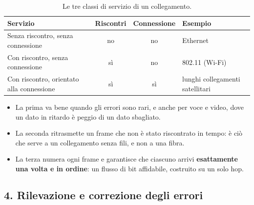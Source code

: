 \begin{table}[H]
\centering
\begin{tabular}{lccl}
\toprule
\textbf{Servizio} & \textbf{Riscontri} & \textbf{Connessione} & \textbf{Esempio} \\
\midrule
Senza riscontro, senza connessione & no & no & Ethernet \\
Con riscontro, senza connessione & sì & no & 802.11 (Wi-Fi) \\
Con riscontro, orientato alla connessione & sì & sì & lunghi collegamenti satellitari \\
\bottomrule
\end{tabular}
\caption{Le tre classi di servizio di un collegamento.}
\end{table}

\begin{itemize}
    \item La prima va bene quando gli errori sono rari, e anche per voce e video, dove un dato in ritardo è peggio di un dato
          sbagliato.
    \item La seconda ritrasmette un frame che non è stato riscontrato in tempo: è ciò che serve a un collegamento senza fili, e
          non a una fibra.
    \item La terza numera ogni frame e garantisce che ciascuno arrivi \textbf{esattamente una volta e in ordine}: un flusso di bit
          affidabile, costruito su un solo hop.
\end{itemize}


\subsection{4. Rilevazione e correzione degli errori}

